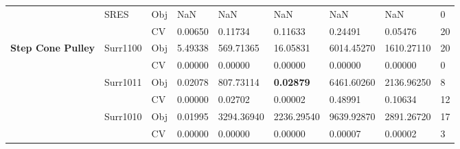 \begin{table*}[!htb]
\begin{tabular}{lllllllll}
		& SRES                               & Obj                                & NaN                                & NaN                                & NaN                                  & NaN                                 & NaN                               & 0                \\
		&                                    & CV                                 & 0.00650                            & 0.11734                            & 0.11633                              & 0.24491                             & 0.05476                           & 20               \\ \hline
		\multirow{16}{*}{\textbf{Step Cone Pulley}}  & Surr1100                           & Obj                                & 5.49338                            & 569.71365                          & 16.05831                             & 6014.45270                          & 1610.27110                        & 20               \\
		&                                    & CV                                 & 0.00000                            & 0.00000                            & 0.00000                              & 0.00000                             & 0.00000                           & 0                \\
		& Surr1011                           & Obj                                & 0.02078                            & 807.73114                          & \textbf{0.02879}                     & 6461.60260                          & 2136.96250                        & 8                \\
		&                                    & CV                                 & 0.00000                            & 0.02702                            & 0.00002                              & 0.48991                             & 0.10634                           & 12               \\
		& Surr1010                           & Obj                                & 0.01995                            & 3294.36940                         & 2236.29540                           & 9639.92870                          & 2891.26720                        & 17               \\
		&                                    & CV                                 & 0.00000                            & 0.00000                            & 0.00000                              & 0.00007                             & 0.00002                           & 3                \\

\end{tabular}
\end{table*}
